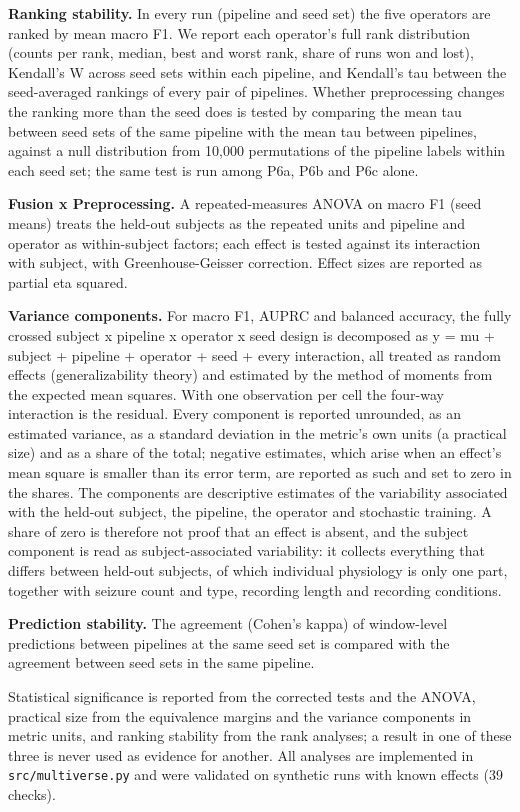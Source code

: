 \documentclass[11pt,a4paper]{article}
\begin{document}
\textbf{Ranking stability.} In every run (pipeline and seed set) the five operators are
ranked by mean macro F1. We report each operator's full rank distribution (counts per
rank, median, best and worst rank, share of runs won and lost), Kendall's W across
seed sets within each pipeline, and Kendall's tau between the seed-averaged rankings of
every pair of pipelines. Whether preprocessing changes the ranking more than the seed
does is tested by comparing the mean tau between seed sets of the same pipeline with
the mean tau between pipelines, against a null distribution from 10,000 permutations
of the pipeline labels within each seed set; the same test is run among P6a, P6b and
P6c alone.

\textbf{Fusion x Preprocessing.} A repeated-measures ANOVA on macro F1 (seed means) treats
the held-out subjects as the repeated units and pipeline and operator as within-subject
factors; each effect is tested against its interaction with subject, with
Greenhouse-Geisser correction. Effect sizes are reported as partial eta squared.

\textbf{Variance components.} For macro F1, AUPRC and balanced accuracy, the fully crossed
subject x pipeline x operator x seed design is decomposed as y = mu + subject +
pipeline + operator + seed + every interaction, all treated as random effects
(generalizability theory) and estimated by the method of moments from the expected
mean squares. With one observation per cell the four-way interaction is the residual.
Every component is reported unrounded, as an estimated variance, as a standard
deviation in the metric's own units (a practical size) and as a share of the total;
negative estimates, which arise when an effect's mean square is smaller than its error
term, are reported as such and set to zero in the shares. The components are
descriptive estimates of the variability associated with the held-out subject, the
pipeline, the operator and stochastic training. A share of zero is therefore not proof
that an effect is absent, and the subject component is read as subject-associated
variability: it collects everything that differs between held-out subjects, of which
individual physiology is only one part, together with seizure count and type, recording
length and recording conditions.

\textbf{Prediction stability.} The agreement (Cohen's kappa) of window-level predictions
between pipelines at the same seed set is compared with the agreement between seed
sets in the same pipeline.

Statistical significance is reported from the corrected tests and the ANOVA, practical
size from the equivalence margins and the variance components in metric units, and
ranking stability from the rank analyses; a result in one of these three is never
used as evidence for another. All analyses are implemented in \nolinkurl{src/multiverse.py} and
were validated on synthetic runs with known effects (39 checks).
\end{document}
